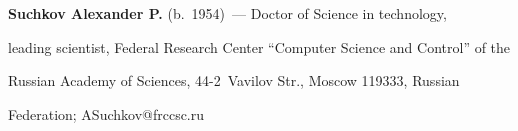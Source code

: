 \noindent

\textbf{Suchkov Alexander P.} (b.\ 1954)~--- Doctor of Science in technology, 

leading scientist, Federal Research Center ``Computer Science and Control'' of the 

Russian Academy of Sciences, 44-2~Vavilov Str., Moscow 119333, Russian 

Federation; \mbox{ASuchkov@frccsc.ru}







  

\label{end\stat}



\renewcommand{\bibname}{\protect\rm Литература} 

